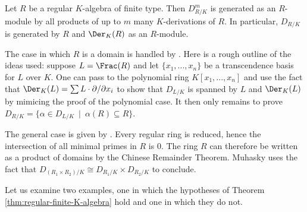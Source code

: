 \begin{thm}\label{thm:regular-finite-K-algebra}
	Let $R$ be a regular $K$-algebra of finite type. Then $D^m_{R/K}$ is generated as an $R$-module by all products of up to $m$ many $K$-derivations of $R$. In particular, $D_{R/K}$ is generated by $R$ and $\Der_K(R)$ as an $R$-module.
\end{thm}
\begin{prf}
	The case in which $R$ is a domain is handled by \cite[Theorem 15.5.5]{mcconnell-robson}. Here is a rough outline of the ideas used: suppose $L = \Frac(R)$ and let $\{x_1,...,x_n\}$ be a transcendence basis for $L$ over $K$. One can pass to the polynomial ring $K[x_1,...,x_n]$ and use the fact that $\Der_K(L) = \sum L\cdot \partial/\partial x_i$ to show that $D_{L/K}$ is spanned by $L$ and $\Der_K(L)$ by mimicing the proof of the polynomial case. It then only remains to prove $D_{R/K} = \{\alpha \in D_{L/K} ~\mid~ \alpha(R) \subseteq R\}$.

	The general case is given by \cite[Theorem 1.15]{muhasky}. Every regular ring is reduced, hence the intersection of all minimal primes in $R$ is $0$. The ring $R$ can therefore be written as a product of domains by the Chinese Remainder Theorem. Muhasky uses the fact that $D_{(R_1\times R_2)/K} \cong D_{R_1/K} \times D_{R_2/K}$ to conclude.
\end{prf}
Let us examine two examples, one in which the hypotheses of Theorem \ref{thm:regular-finite-K-algebra} hold and one in which they do not.
